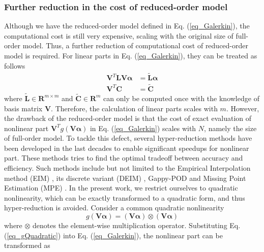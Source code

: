 \documentclass[preprint, 10pt]{elsarticle}
\begin{document}
\subsubsection{Further reduction in the cost of reduced-order model}
Although we have the reduced-order model defined in Eq. (\ref{eq_Galerkin}), the computational cost is still very expensive, scaling with the original size of full-order model. Thus, a further reduction of computational cost of reduced-order model is required. For linear parts in Eq. (\ref{eq_Galerkin}), they can be treated as follows
\begin{equation}
\begin{aligned}
\mathbf{V}^T \mathbf{L} \mathbf{V} \pmb{\alpha}  &= \tilde {\mathbf{L}} \pmb{\alpha} \\
\mathbf{V}^T \mathbf{C}                          &= \tilde {\mathbf{C}}
\end{aligned}
\label{eq_ReductionLinear}
\end{equation}
where $\tilde {\mathbf{L}} \in \mathbf{R}^{m \times m}$ and $\tilde {\mathbf{C}} \in \mathbf{R}^{m} $ can only be computed once with the knowledge of basis matrix $\mathbf{V}$.
Therefore, the calculation of linear parts scales with $m$. However, the drawback of the reduced-order model is that the cost of exact evaluation of nonlinear part $\mathbf{V}^T g \left( \mathbf{V} \pmb{\alpha} \right)$  in Eq. (\ref{eq_Galerkin}) scales with $N$, namely the size of full-order model. To tackle this defect, several hyper-reduction methods have been developed in the last decades to enable significant speedups for nonlinear part. These methods tries to find the optimal tradeoff between accuracy and efficiency. Such methods include but not limited to the Empirical Interpolation method (EIM) \cite{barrault2004empirical}, its
discrete variant (DEIM) \cite{chaturantabut2010nonlinear}, Gappy-POD \cite{everson1995karhunen}and Missing Point Estimation (MPE) \cite{astrid2008missing}. In the present work, we restrict ourselves to quadratic nonlinearity, which can be exactly transformed to a quadratic form, and thus hyper-reduction is avoided. Consider a common quadratic nonlinearity
\begin{equation}
g \left( \mathbf{V} \pmb{\alpha} \right)
=
\left( \mathbf{V} \pmb{\alpha} \right) \otimes \left( \mathbf{V} \pmb{\alpha} \right)
\label{eq_gQuadratic}
\end{equation}
where $\otimes$ denotes the element-wise multiplication operator. Substituting Eq. (\ref{eq_gQuadratic}) into Eq. (\ref{eq_Galerkin}), the nonlinear part can be transformed as
\end{document}
